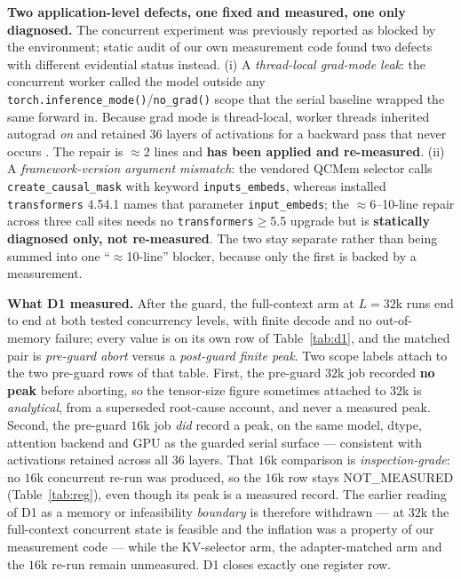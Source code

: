 \documentclass{article}
\newcommand{\code}[1]{\texttt{#1}}
\begin{document}
\textbf{Two application-level defects, one fixed and measured, one only diagnosed.} The
concurrent experiment was previously reported as blocked by the environment; static audit of our
own measurement code found two defects with different evidential status instead. (i) A
\emph{thread-local grad-mode leak}: the concurrent worker called the model outside any
\code{torch.inference\_mode()}/\code{no\_grad()} scope that the serial baseline wrapped the same
forward in. Because grad mode is thread-local, worker threads inherited autograd \emph{on} and
retained 36 layers of activations for a backward pass that never occurs
\citep{paszke2019pytorch}. The repair is $\approx$2 lines and \textbf{has been applied and
re-measured}. (ii) A \emph{framework-version argument mismatch}: the vendored QCMem selector
calls \code{create\_causal\_mask} with keyword \code{inputs\_embeds}, whereas installed
\code{transformers} 4.54.1 names that parameter \code{input\_embeds}; the $\approx$6--10-line
repair across three call sites needs no \code{transformers}${\ge}$5.5 upgrade but is
\textbf{statically diagnosed only, not re-measured}. The two stay separate rather than being
summed into one ``$\approx$10-line'' blocker, because only the first is backed by a measurement.

\textbf{What D1 measured.} After the guard, the full-context arm at $L{=}32$k runs end to end
at both tested concurrency levels, with finite decode and no out-of-memory failure; every value
is on its own row of Table~\ref{tab:d1}, and the matched pair is \emph{pre-guard abort} versus a
\emph{post-guard finite peak}. Two scope labels attach to the two pre-guard rows of that table.
First, the pre-guard $32$k job recorded \textbf{no peak} before aborting, so the tensor-size
figure sometimes attached to $32$k is \emph{analytical}, from a superseded root-cause account,
and never a measured peak. Second, the pre-guard $16$k job \emph{did} record a peak, on the same
model, dtype, attention backend and GPU as the guarded serial surface --- consistent with
activations retained across all 36 layers. That $16$k comparison is \emph{inspection-grade}: no
$16$k concurrent re-run was produced, so the $16$k row stays NOT\_MEASURED
(Table~\ref{tab:reg}), even though its peak is a measured record. The earlier reading of D1 as a
memory or infeasibility \emph{boundary} is therefore withdrawn --- at $32$k the full-context
concurrent state is feasible and the inflation was a property of our measurement code --- while
the KV-selector arm, the adapter-matched arm and the $16$k re-run remain unmeasured. D1 closes
exactly one register row.
\end{document}
